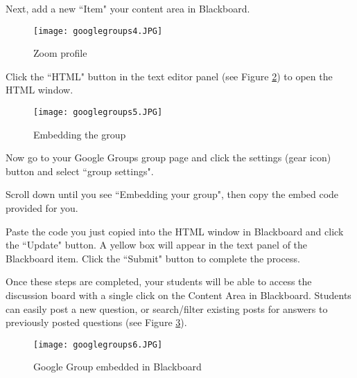 \begin{enumerate}
    \SubItem Next, add a new ``Item" your content area in Blackboard.
    \begin{figure}[h]
    \centering
    \centering\texttt{[image: googlegroups4.JPG]}
    \caption{Zoom profile}
    \label{fig:googlegroups4}
    \end{figure}
    
    \SubItem Click the ``HTML" button in the text editor panel (see Figure \ref{fig:googlegroups5}) to open the HTML window.
    \begin{figure}[h]
    \centering
    \centering\texttt{[image: googlegroups5.JPG]}
    \caption{Embedding the group}
    \label{fig:googlegroups5}
    \end{figure}
    
    \SubItem Now go to your Google Groups group page and click the settings (gear icon) button and select ``group settings".
    
    \SubItem Scroll down until you see ``Embedding your group", then copy the embed code provided for you. 

    \SubItem Paste the code you just copied into the HTML window in Blackboard and click the ``Update" button. A yellow box will appear in the text panel of the Blackboard item.  Click the ``Submit" button to complete the process.
\end{enumerate} 
\vspace{.5cm}

Once these steps are completed, your students will be able to access the discussion board with a single click on the Content Area in Blackboard.  Students can easily post a new question, or search/filter existing posts for answers to previously posted questions (see Figure \ref{fig:googlegroups6}).
    \begin{figure}[h]
    \centering
    \centering\texttt{[image: googlegroups6.JPG]}
    \caption{Google Group embedded in Blackboard}
    \label{fig:googlegroups6}
    \end{figure}
